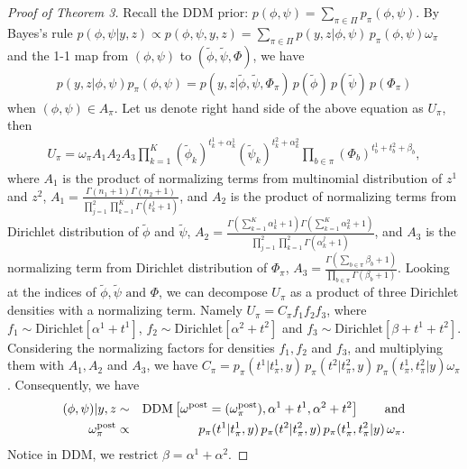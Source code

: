 \documentclass[aoas,preprint]{imsart}
\begin{document}
\begin{proof}[Proof of Theorem 3]
Recall the DDM prior: $p(\phi,\psi) = \sum_{\pi \in \Pi} p_\pi(\phi,\psi)$. 
By Bayes's rule $p(\phi,\psi | y,z) \propto p(\phi,\psi, y, z) = \sum_{\pi \in \Pi}  p(y, z | \phi,\psi)\, p_\pi(\phi,\psi)\omega_\pi$
and the 1-1 map from $(\phi,\psi)$ to $(\tilde \phi, \tilde \psi, \Phi)$, we have
\begin{eqnarray*}
p(y, z | \phi,\psi) p_\pi(\phi,\psi) = p(y, z | \tilde{\phi} , \tilde{\psi}, \Phi_\pi)\, p(\tilde{\phi}) \, p (\tilde{\psi}) \, p(\Phi_\pi)
\end{eqnarray*}
when $(\phi,\psi) \in A_\pi$.
Let us denote right hand side of the above equation as $U_\pi$, then
\begin{eqnarray*}
U_\pi = \omega_\pi A_1 A_2 A_3\prod_{k = 1}^K (\tilde{ \phi }_k)^{t_k^1 + \alpha_k^1} (\tilde{ \psi }_k)^{t_k^2 + \alpha_k^2}   \prod_{b \in \pi} (\Phi_b)^{t_b^1 + t_b^2 + \beta_b},
\end{eqnarray*}
where $A_1$ is the product of normalizing terms from multinomial distribution of $z^1$ and $z^2$, $A_1 =  \frac{\Gamma(n_1 + 1)\Gamma(n_2 + 1)}{\prod_{j = 1}^2\prod_{k = 1}^K \Gamma(t_k^j + 1) } $, and
$A_2$ is the product of normalizing terms from Dirichlet distribution of $\tilde{\phi}$ and $\tilde{\psi}$,
$A_2 = \frac{ \Gamma( \sum_{k = 1}^K \alpha_k^1 + 1)  \Gamma( \sum_{k = 1}^K \alpha_k^2 + 1)}{ \prod_{j = 1}^2 \prod_{k = 1}^2 \Gamma(\alpha_k^j + 1)}$, and
$A_3$ is the normalizing term from Dirichlet distribution of $\Phi_\pi$, $A_3 = \frac{\Gamma(\sum_{b \in \pi } \beta_b + 1)}{\prod_{b\in \pi} \Gamma(\beta_b + 1)}$.  Looking at the indices of $\tilde \phi, \tilde \psi \text{ and } \Phi$, we can decompose $U_\pi$ as a product of three Dirichlet densities with a normalizing term. 
Namely $U_\pi = C_\pi  f_1 f_2 f_3$, where
$f_1 \sim \text{Dirichlet}[\alpha^1 + t^1]$, $f_2 \sim \text{Dirichlet}[\alpha^2 + t^2]$ and $f_3 \sim \text{Dirichlet}[\beta + t^1 + t^2]$.
Considering the normalizing factors for densities $f_1,f_2$ and $f_3$, and multiplying them with $A_1, A_2$ and $A_3$,
we have $C_\pi =  p_\pi(t^1 | t^1_{\pi},y)\, p_\pi(t^2|  t^2_{\pi},y )
 \, p_\pi( t^1_{\pi}, t^2_{\pi} | y ) \omega_\pi$.  Consequently, we have 
 \begin{eqnarray*}
 (\phi,\psi)|y,z  &\sim& {\mbox {\rm DDM}}\left[ \omega^{\rm post}=(\omega^{\rm post}_\pi), \alpha^1 + t^1, \alpha^2 + t^2  \right]  \qquad {\mbox {\rm and}} \\
   \omega^{\rm post}_\pi &\propto &
 p_\pi(t^1 | t^1_{\pi},y)\, p_\pi(t^2|  t^2_{\pi},y )
 \, p_\pi( t^1_{\pi}, t^2_{\pi} | y ) \, \omega_\pi.\\
 \end{eqnarray*}
 Notice in DDM, we restrict $\beta = \alpha^1 + \alpha^2$.

\end{proof}
\end{document}
